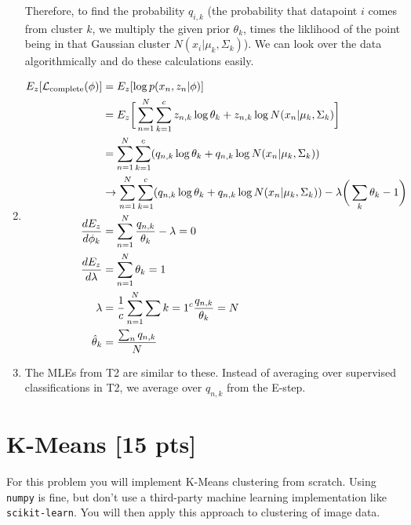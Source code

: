 \documentclass[submit]{harvardml}
\begin{document}
\begin{enumerate}
        Therefore, to find the probability $q_{i,k}$ (the probability that
        datapoint $i$ comes from cluster $k$, we multiply the given prior
        $\theta_k$, times the liklihood of the point being in that Gaussian
        cluster $N(x_i|\mu_k,\Sigma_k)$). We can look over the data
        algorithmically and do these calculations easily.
    \item
        \begin{align*}
            E_z[\mathcal{L}_{\text{complete}}(\phi)]
                &= E_z[\log p(x_n,z_n|\phi)] \\
                &= E_z \bigg[\sum_{n=1}^N\sum_{k=1}^{c} z_{n,k} \log\theta_k +
                   z_{n,k} \log N(x_n|\mu_k,\Sigma_k) \bigg] \\
                &= \sum_{n=1}^N\sum_{k=1}^c (q_{n,k} \log\theta_k + q_{n,k}
                   \log N(x_n|\mu_k,\Sigma_k)) \\
                &\to \sum_{n=1}^N\sum_{k=1}^c (q_{n,k} \log\theta_k + q_{n,k}
                   \log N(x_n|\mu_k,\Sigma_k)) - \lambda \bigg(\sum_k
                   \theta_k-1 \bigg) \\
            \frac{dE_z}{d\phi_k}
                &= \sum_{n=1}^{N}\frac{q_{n,k}}{\theta_k} - \lambda = 0 \\
            \frac{dE_z}{d\lambda}
                &= \sum_{n=1}^{N}\theta_k = 1 \\
            \lambda
                &= \frac{1}{c} \sum_{n=1}^{N} \sum k =
                   1^c \frac{q_{n,k}}{\theta_k} = N \\
            \hat{\theta}_k
            &= \frac{\sum_n q_{n,k}}{N}
        \end{align*}
    \item
        The MLEs from T2 are similar to these. Instead of averaging over
        supervised classifications in T2, we average over $q_{n,k}$ from the
        E-step.
\end{enumerate}

\newpage

\section*{K-Means [15 pts]} %

For this problem you will implement  K-Means clustering from scratch. Using
\texttt{numpy} is fine, but don't use a third-party machine learning
implementation like \texttt{scikit-learn}. You will then apply this approach to
clustering of image data.
\end{document}

